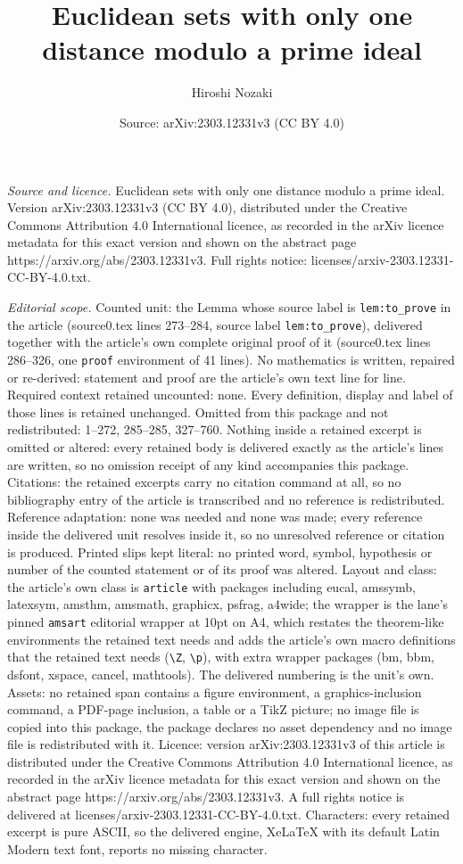 \documentclass[10pt,a4paper]{amsart}
\title[Euclidean sets with only one distance modulo a prime ideal]{Euclidean sets with only one distance modulo a prime ideal}
\author{Hiroshi Nozaki}
\date{Source: arXiv:2303.12331v3 (CC BY 4.0)}
\begin{document}
\maketitle

\noindent\emph{Source and licence.} Euclidean sets with only one distance modulo a prime ideal. Version arXiv:2303.12331v3 (CC BY 4.0), distributed under the Creative Commons Attribution 4.0 International licence, as recorded in the arXiv licence metadata for this exact version and shown on the abstract page https://arxiv.org/abs/2303.12331v3. Full rights notice: licenses/arxiv-2303.12331-CC-BY-4.0.txt.\par\smallskip

\noindent\textit{Editorial scope.} Counted unit: the Lemma whose source label is \texttt{lem:to\_prove} in the article (source0.tex lines 273--284, source label \texttt{lem:to\_prove}), delivered together with the article's own complete original proof of it (source0.tex lines 286--326, one \texttt{proof} environment of 41 lines). No mathematics is written, repaired or re-derived: statement and proof are the article's own text line for line. Required context retained uncounted: none. Every definition, display and label of those lines is retained unchanged. Omitted from this package and not redistributed: 1--272, 285--285, 327--760. Nothing inside a retained excerpt is omitted or altered: every retained body is delivered exactly as the article's lines are written, so no omission receipt of any kind accompanies this package. Citations: the retained excerpts carry no citation command at all, so no bibliography entry of the article is transcribed and no reference is redistributed. Reference adaptation: none was needed and none was made; every reference inside the delivered unit resolves inside it, so no unresolved reference or citation is produced. Printed slips kept literal: no printed word, symbol, hypothesis or number of the counted statement or of its proof was altered. Layout and class: the article's own class is \texttt{article} with packages including eucal, amssymb, latexsym, amsthm, amsmath, graphicx, psfrag, a4wide; the wrapper is the lane's pinned \texttt{amsart} editorial wrapper at 10pt on A4, which restates the theorem-like environments the retained text needs and adds the article's own macro definitions that the retained text needs (\texttt{\textbackslash Z}, \texttt{\textbackslash p}), with extra wrapper packages (bm, bbm, dsfont, xspace, cancel, mathtools). The delivered numbering is the unit's own. Assets: no retained span contains a figure environment, a graphics-inclusion command, a PDF-page inclusion, a table or a TikZ picture; no image file is copied into this package, the package declares no asset dependency and no image file is redistributed with it. Licence: version arXiv:2303.12331v3 of this article is distributed under the Creative Commons Attribution 4.0 International licence, as recorded in the arXiv licence metadata for this exact version and shown on the abstract page https://arxiv.org/abs/2303.12331v3. A full rights notice is delivered at licenses/arxiv-2303.12331-CC-BY-4.0.txt. Characters: every retained excerpt is pure ASCII, so the delivered engine, XeLaTeX with its default Latin Modern text font, reports no missing character.
\end{document}
